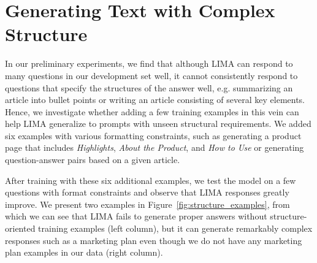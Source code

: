 \section{Generating Text with Complex Structure}
\label{sec:structure}

In our preliminary experiments, we find that although LIMA can respond to many questions in our development set well, it cannot consistently respond to questions that specify the structures of the answer well, e.g. summarizing an article into bullet points or writing an article consisting of several key elements. 
Hence, we investigate whether adding a few training examples in this vein can help LIMA generalize to prompts with unseen structural requirements.
We added six examples with various formatting constraints, such as generating a product page that includes \textit{Highlights}, \textit{About the Product}, and \textit{How to Use} or generating question-answer pairs based on a given article.

After training with these six additional examples, we test the model on a few questions with format constraints and observe that LIMA responses greatly improve.
We present two examples in Figure~\ref{fig:structure_examples}, from which we can see that LIMA fails to generate proper answers without structure-oriented training examples (left column), but it can generate remarkably complex responses such as a marketing plan even though we do not have any marketing plan examples in our data (right column).


